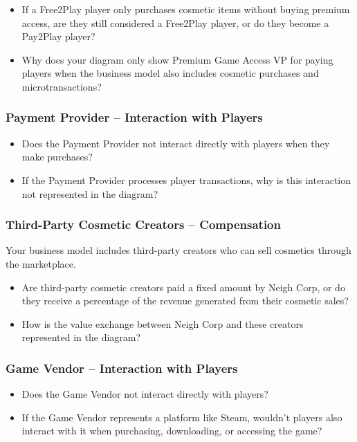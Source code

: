 \documentclass{article}
\begin{document}
\begin{itemize}
    \item If a Free2Play player only purchases cosmetic items without buying premium access, are they still considered a Free2Play player, or do they become a Pay2Play player?
    \item Why does your diagram only show Premium Game Access VP for paying players when the business model also includes cosmetic purchases and microtransactions?
\end{itemize}

\subsubsection*{Payment Provider -- Interaction with Players}

\begin{itemize}
    \item Does the Payment Provider not interact directly with players when they make purchases?
    \item If the Payment Provider processes player transactions, why is this interaction not represented in the diagram?
\end{itemize}

\subsubsection*{Third-Party Cosmetic Creators -- Compensation}

Your business model includes third-party creators who can sell cosmetics through the marketplace.

\begin{itemize}
    \item Are third-party cosmetic creators paid a fixed amount by Neigh Corp, or do they receive a percentage of the revenue generated from their cosmetic sales?
    \item How is the value exchange between Neigh Corp and these creators represented in the diagram?
\end{itemize}

\subsubsection*{Game Vendor -- Interaction with Players}

\begin{itemize}
    \item Does the Game Vendor not interact directly with players?
    \item If the Game Vendor represents a platform like Steam, wouldn't players also interact with it when purchasing, downloading, or accessing the game?
\end{itemize}
\end{document}
